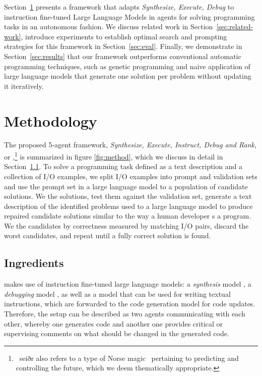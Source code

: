 Section~\ref{sec:methodology} presents a framework that adapts \emph{Synthesize, Execute, Debug} to instruction fine-tuned Large Language Models in agents for solving programming tasks in an autonomous fashion. 
We discuss related work in Section~\ref{sec:related-work}, introduce experiments to establish optimal search and prompting strategies for this framework in Section~\ref{sec:eval}. 
Finally, we demonstrate in Section~\ref{sec:results} that our framework outperforms conventional automatic programming techniques, such as genetic programming and naive application of large language models that generate one solution per problem without updating it iteratively. 

\section{Methodology}
\label{sec:methodology}
The proposed 5-agent framework, \emph{Synthesize, Execute, Instruct, Debug and Rank}, or \method{},\footnote{~seiðr also refers to a type of Norse magic~\cite{blain2002:nine} pertaining to predicting and controlling the future, which we deem thematically appropriate.} is summarized in figure \ref{fig:method}, which we discuss in detail in Section~\ref{sec:ingredients}.
To solve a programming task defined as a text description and a collection of I/O examples, we split I/O examples into prompt and validation sets and use the prompt set in a large language model to \synthesize{} a population of candidate solutions.
We \execute{} the solutions, test them against the validation set, generate a text description of the identified problems used to \instruct{} a large language model to produce repaired candidate solutions similar to the way a human developer \debug{}s a program.
We \rank{} the candidates
by correctness measured by matching I/O pairs, discard the worst candidates, and repeat until a fully correct solution is found.

 

\subsection{Ingredients}
\label{sec:ingredients}

\method{} makes use of instruction fine-tuned large language models: a \emph{synthesis} model \synthmodel{}, a \emph{debugging} model \debugmodel{}, as well as a model \textmodel{} that can be used for writing textual instructions, which are forwarded to the code generation model \debugmodel{} for code updates. 
Therefore, the setup can be described as two agents communicating with each other, whereby one generates code and another one provides critical or supervising comments on what should be changed in the generated code. 

